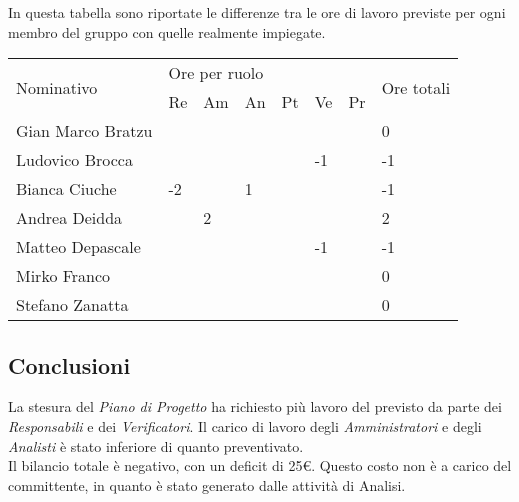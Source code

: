 \begin{flushleft}
    In questa tabella  sono riportate le differenze tra le ore di lavoro previste per ogni membro del gruppo con quelle realmente impiegate.\\
    \begin{table}[h]
        \begin{tabular}{|l|l|l|l|l|l|l|l|}
        \hline
        \multirow{2}{*}{Nominativo} & \multicolumn{6}{l|}{Ore per ruolo} & \multirow{2}{*}{Ore totali} \\ \cline{2-7}
                                    & Re   & Am  & An  & Pt  & Ve  & Pr  &                             \\ \hline
        Gian Marco Bratzu           &      &     &     &     &     &     & 0                           \\ \hline
        Ludovico Brocca             &      &     &     &     & -1  &     & -1                          \\ \hline
        Bianca Ciuche               & -2   &     & 1   &     &     &     & -1                          \\ \hline
        Andrea Deidda               &      & 2   &     &     &     &     & 2                           \\ \hline
        Matteo Depascale            &      &     &     &     & -1  &     & -1                          \\ \hline
        Mirko Franco                &      &     &     &     &     &     & 0                           \\ \hline
        Stefano Zanatta             &      &     &     &     &     &     & 0                           \\ \hline
        \end{tabular}
        \end{table}
    \subsection{Conclusioni}
    La stesura del \textit{Piano di Progetto} ha richiesto più lavoro del previsto da parte dei \textit{Responsabili} e dei \textit{Verificatori}. Il carico di lavoro degli \textit{Amministratori} e degli \textit{Analisti} è stato inferiore di quanto preventivato.\\ Il bilancio totale è negativo, con un deficit di 25\euro. Questo costo non è a carico del committente, in quanto è stato generato dalle attività di Analisi.
    \end{flushleft}